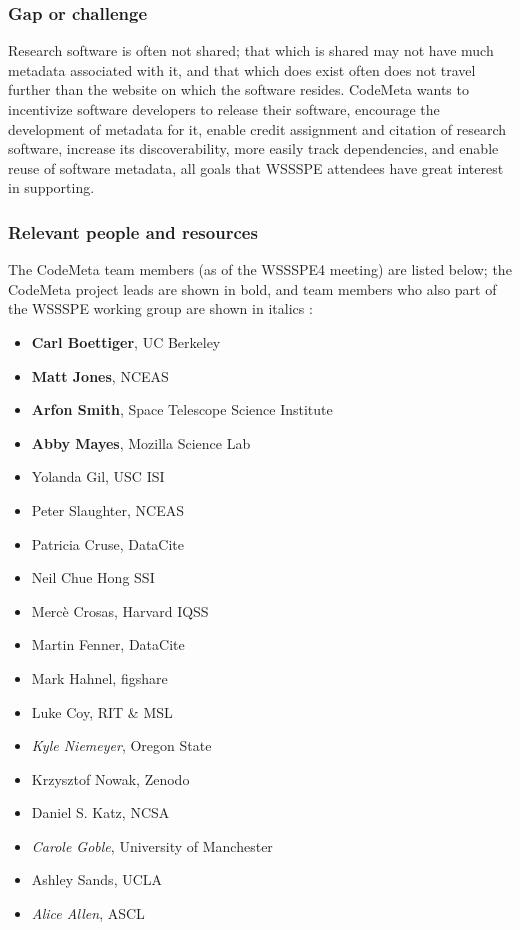 \subsubsection{Gap or challenge}

Research software is often not shared; that which is shared may not have much metadata associated with it, and that which does exist often does not travel further than the website on which the software resides. CodeMeta wants to incentivize software developers to release their software, encourage the development of metadata for it, enable credit assignment and citation of research software, increase its discoverability, more easily track dependencies, and enable reuse of software metadata, all goals that WSSSPE attendees have great interest in supporting. 

\subsubsection{Relevant people and resources}

The CodeMeta team members (as of the WSSSPE4 meeting) are listed below; the CodeMeta project leads are shown in bold, and team members who also part of the WSSSPE working group are shown in italics :

\begin{itemize}
\item {\bf Carl Boettiger}, UC Berkeley
\item {\bf Matt Jones}, NCEAS
\item {\bf Arfon Smith}, Space Telescope Science Institute
\item {\bf Abby Mayes}, Mozilla Science Lab
\item Yolanda Gil, USC ISI
\item Peter Slaughter, NCEAS
\item Patricia Cruse, DataCite
\item Neil Chue Hong SSI
\item Merc\`{e} Crosas, Harvard IQSS
\item Martin Fenner, DataCite
\item Mark Hahnel, figshare
\item Luke Coy, RIT \& MSL
\item {\em Kyle Niemeyer}, Oregon State
\item Krzysztof Nowak, Zenodo
\item Daniel S. Katz, NCSA
\item {\em Carole Goble}, University of Manchester
\item Ashley Sands, UCLA
\item {\em Alice Allen}, ASCL

\end {itemize}

